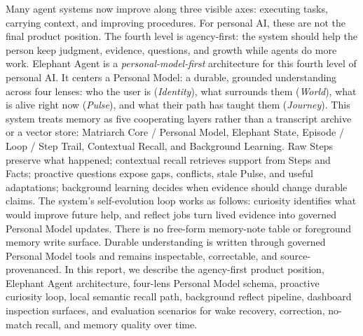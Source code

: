 Many agent systems now improve along three visible axes: executing tasks,
carrying context, and improving procedures. For personal AI, these are not the
final product position. The fourth level is agency-first: the system should help
the person keep judgment, evidence, questions, and growth while agents do more
work. Elephant Agent is a \emph{personal-model-first} architecture for this
fourth level of personal AI. It centers a Personal Model: a durable, grounded
understanding across four lenses: who the user is (\textit{Identity}), what surrounds them
(\textit{World}), what is alive right now (\textit{Pulse}), and what their path
has taught them (\textit{Journey}). This system treats memory as five cooperating layers rather than a transcript
archive or a vector store: Matriarch Core / Personal Model, Elephant State,
Episode / Loop / Step Trail, Contextual Recall, and Background Learning. Raw
Steps preserve what happened; contextual recall retrieves support from Steps
and Facts; proactive questions expose gaps, conflicts, stale Pulse, and useful
adaptations; background learning decides when evidence should change durable
claims. The system's self-evolution loop works as follows: curiosity identifies what
would improve future help, and reflect jobs turn lived evidence into governed
Personal Model updates. There is no free-form memory-note table or foreground
memory write surface. Durable understanding is written through governed
Personal Model tools and remains inspectable, correctable, and
source-provenanced. In this report, we describe the agency-first product position, Elephant Agent architecture, four-lens Personal Model
schema, proactive curiosity loop, local semantic recall path, background reflect
pipeline, dashboard inspection surfaces, and evaluation scenarios for wake
recovery, correction, no-match recall, and memory quality over time.
